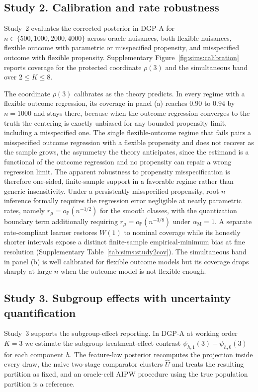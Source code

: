 \documentclass[11pt]{article}
\newcommand{\Pp}{\mathbb P}
\newcommand{\opro}{o_{\Pp}}
\newcommand{\am}{\alpha_{\mathrm M}}
\begin{document}
\subsection{Study 2. Calibration and rate robustness}\label{sec:sims:calibration}

Study~2 evaluates the corrected posterior in DGP-A for $n\in\{500,1000,2000,4000\}$ across oracle nuisances, both-flexible nuisances, flexible outcome with parametric or misspecified propensity, and misspecified outcome with flexible propensity.  Supplementary Figure~\ref{fig:sims:calibration} reports coverage for the protected coordinate $\rho(3)$ and the simultaneous band over $2\le K\le8$.

The coordinate $\rho(3)$ calibrates as the theory predicts. In every regime with a flexible outcome regression, its coverage in panel (a) reaches $0.90$ to $0.94$ by $n=1000$ and stays there, because when the outcome regression converges to the truth the centering is exactly unbiased for any bounded propensity limit, including a misspecified one. The single flexible-outcome regime that fails pairs a misspecified outcome regression with a flexible propensity and does not recover as the sample grows, the asymmetry the theory anticipates, since the estimand is a functional of the outcome regression and no propensity can repair a wrong regression limit. The apparent robustness to propensity misspecification is therefore one-sided, finite-sample support in a favorable regime rather than generic insensitivity. Under a persistently misspecified propensity, root-$n$ inference formally requires the regression error negligible at nearly parametric rates, namely $r_\mu=\opro(n^{-1/2})$ for the smooth classes, with the quantization boundary term additionally requiring $r_\mu=\opro(n^{-3/8})$ under $\am=1$. A separate rate-compliant learner restores $W(1)$ to nominal coverage while its honestly shorter intervals expose a distinct finite-sample empirical-minimum bias at fine resolution (Supplementary Table~\ref{tab:sims:study2cov}). The simultaneous band in panel (b) is well calibrated for flexible outcome models but its coverage drops sharply at large $n$ when the outcome model is not flexible enough.

\subsection{Study 3. Subgroup effects with uncertainty quantification}\label{sec:sims:subgroup_effects}

Study~3 supports the subgroup-effect reporting. In DGP-A at working order $K=3$ we estimate the subgroup treatment-effect contrast $\psi_{h,1}(3)-\psi_{h,0}(3)$ for each component $h$. The feature-law posterior recomputes the projection inside every draw, the naive two-stage comparator clusters $\widehat U$ and treats the resulting partition as fixed, and an oracle-cell AIPW procedure using the true population partition is a reference. 
\end{document}
